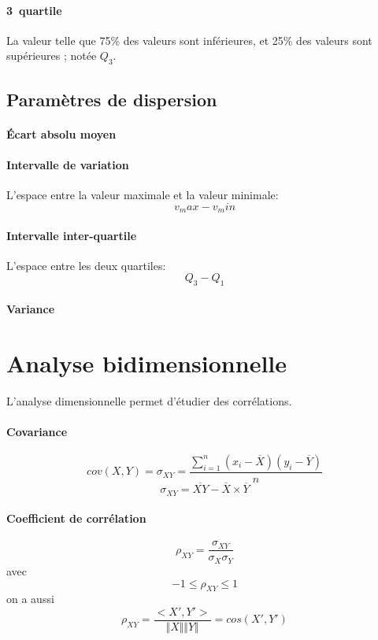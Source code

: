 \documentclass[10pt,a4paper,french]{article}
\begin{document}
\paragraph{3\ieme~quartile}
La valeur telle que 75\% des valeurs sont inférieures, et 25\% des valeurs sont supérieures ; notée $Q_3$.

\subsection{Paramètres de dispersion}

\paragraph{Écart absolu moyen}

\paragraph{Intervalle de variation}
L'espace entre la valeur maximale et la valeur minimale: \[ v_max - v_min \]

\paragraph{Intervalle inter-quartile}
L'espace entre les deux quartiles: \[ Q_3 - Q_1 \]

\paragraph{Variance}

\section{Analyse bidimensionnelle}

L'analyse dimensionnelle permet d'étudier des corrélations.

\paragraph{Covariance}
\[ cov(X, Y) = \sigma_{X Y} = \frac{\sum_{i=1}^n (x_i - \overline{X}) (y_i - \overline{Y})}{n} \]
\[ \sigma_{X Y} = \overline{X Y} - \overline{X} \times \overline{Y} \]

\paragraph{Coefficient de corrélation}
\[ \rho_{X Y} = \frac{\sigma_{X Y}}{\sigma_X \sigma_Y} \]
avec
\[ -1 \leq \rho_{X Y} \leq 1 \]
on a aussi \[ \rho_{X Y} = \frac{<X', Y'>}{\Vert X \Vert \Vert Y \Vert} = cos(X', Y') \]
\end{document}
